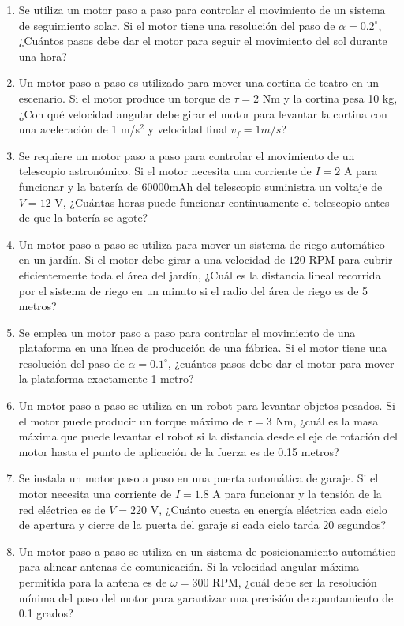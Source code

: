 \documentclass[../main]{subfiles}
\begin{document}
\begin{enumerate}
  \item Se utiliza un motor paso a paso para controlar el movimiento
    de un sistema de seguimiento solar. Si el motor tiene una
    resolución del paso de \( \alpha = 0.2^\circ \), ¿Cuántos pasos
    debe dar el motor para seguir el movimiento del sol durante una hora?

  \item Un motor paso a paso es utilizado para mover una cortina de
    teatro en un escenario. Si el motor produce un torque de \( \tau
    = 2 \) Nm y la cortina pesa 10 kg, ¿Con qué velocidad angular
    debe girar el motor para levantar la cortina con una aceleración
    de 1 m/s\(^2\) y velocidad final $v_f=1m/s$?

  \item Se requiere un motor paso a paso para controlar el movimiento
    de un telescopio astronómico. Si el motor necesita una corriente
    de \( I = 2 \) A para funcionar y la batería de 60000mAh del
    telescopio suministra un voltaje de \( V = 12 \) V, ¿Cuántas
    horas puede funcionar continuamente el telescopio antes de que la
    batería se agote?

  \item Un motor paso a paso se utiliza para mover un sistema de
    riego automático en un jardín. Si el motor debe girar a una
    velocidad de \( 120 \) RPM para cubrir eficientemente toda el
    área del jardín, ¿Cuál es la distancia lineal recorrida por el
    sistema de riego en un minuto si el radio del área de riego es de 5 metros?

  \item Se emplea un motor paso a paso para controlar el movimiento
    de una plataforma en una línea de producción de una fábrica. Si
    el motor tiene una resolución del paso de \( \alpha = 0.1^\circ
    \), ¿cuántos pasos debe dar el motor para mover la plataforma
    exactamente 1 metro?

  \item Un motor paso a paso se utiliza en un robot para levantar
    objetos pesados. Si el motor puede producir un torque máximo de
    \( \tau = 3 \) Nm, ¿cuál es la masa máxima que puede levantar el
    robot si la distancia desde el eje de rotación del motor hasta el
    punto de aplicación de la fuerza es de 0.15 metros?

  \item Se instala un motor paso a paso en una puerta automática de
    garaje. Si el motor necesita una corriente de \( I = 1.8 \) A
    para funcionar y la tensión de la red eléctrica es de \( V = 220
    \) V, ¿Cuánto cuesta en energía eléctrica cada ciclo de apertura
    y cierre de la puerta del garaje si cada ciclo tarda 20 segundos?

  \item Un motor paso a paso se utiliza en un sistema de
    posicionamiento automático para alinear antenas de comunicación.
    Si la velocidad angular máxima permitida para la antena es de \(
    \omega = 300 \) RPM, ¿cuál debe ser la resolución mínima del paso
    del motor para garantizar una precisión de apuntamiento de 0.1 grados?
\end{enumerate}
\end{document}
